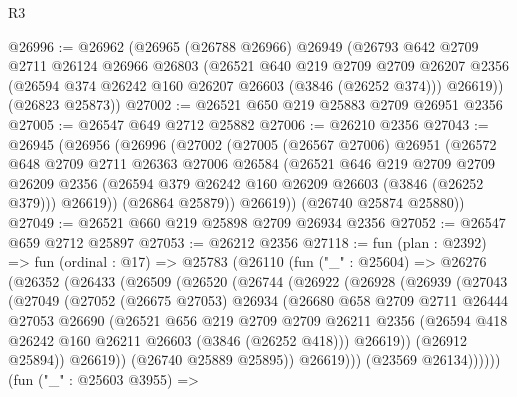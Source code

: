 \begin{lexlean}{R3}
\begin{coremodule}
@26996 := @26962
    (@26965
      (@26788 @26966)
      @26949
      (@26793
        @642
        @2709
        @2711
        @26124
        @26966
        @26803
        (@26521
          @640
          @219
          @2709
          @2709
          @26207
          @2356
          (@26594 @374 @26242 @160 @26207 @26603 (@3846 (@26252 @374)))
          @26619))
      (@26823 @25873))
@27002 := @26521 @650 @219 @25883 @2709 @26951 @2356
@27005 := @26547 @649 @2712 @25882
@27006 := @26210 @2356
@27043 := @26945
    (@26956
      (@26996
        (@27002
          (@27005
            (@26567 @27006)
            @26951
            (@26572
              @648
              @2709
              @2711
              @26363
              @27006
              @26584
              (@26521
                @646
                @219
                @2709
                @2709
                @26209
                @2356
                (@26594 @379 @26242 @160 @26209 @26603 (@3846 (@26252 @379)))
                @26619))
            (@26864 @25879))
          @26619))
      (@26740 @25874 @25880))
@27049 := @26521 @660 @219 @25898 @2709 @26934 @2356
@27052 := @26547 @659 @2712 @25897
@27053 := @26212 @2356
@27118 := fun (plan : @2392) =>
  fun (ordinal : @17) =>
  @25783
    (@26110
      (fun ("_" : @25604) =>
      @26276
        (@26352
          (@26433
            (@26509
              (@26520
                (@26744
                  (@26922
                    (@26928
                      (@26939
                        (@27043
                          (@27049
                            (@27052
                              (@26675 @27053)
                              @26934
                              (@26680
                                @658
                                @2709
                                @2711
                                @26444
                                @27053
                                @26690
                                (@26521
                                  @656
                                  @219
                                  @2709
                                  @2709
                                  @26211
                                  @2356
                                  (@26594 @418 @26242 @160 @26211 @26603 (@3846 (@26252 @418)))
                                  @26619))
                              (@26912 @25894))
                            @26619))
                        (@26740 @25889 @25895))
                      @26619)))
                (@23569 @26134))))))
      (fun ("_" : @25603 @3955) =>

\end{coremodule}
\end{lexlean}
